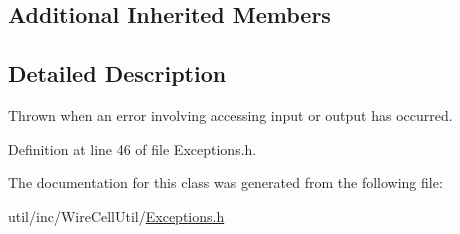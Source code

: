 \subsection*{Additional Inherited Members}


\subsection{Detailed Description}
Thrown when an error involving accessing input or output has occurred. 

Definition at line 46 of file Exceptions.\+h.



The documentation for this class was generated from the following file\+:\begin{DoxyCompactItemize}
\item 
util/inc/\+Wire\+Cell\+Util/\hyperlink{_exceptions_8h}{Exceptions.\+h}\end{DoxyCompactItemize}
